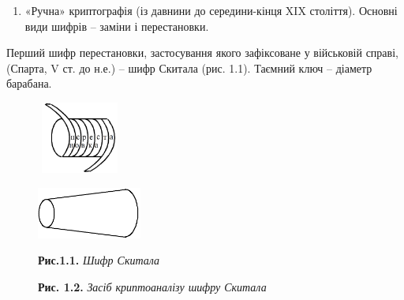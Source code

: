 \documentclass[a4paper]{article}
\newcommand\liststyleWWviiiNumxl{%
\renewcommand\theenumi{\arabic{enumi}}
\renewcommand\theenumii{\arabic{enumii}}
\renewcommand\theenumiii{\arabic{enumiii}}
\renewcommand\theenumiv{\arabic{enumiv}}
\renewcommand\labelenumi{\theenumi.}
\renewcommand\labelenumii{\theenumii.}
\renewcommand\labelenumiii{\theenumiii.}
\renewcommand\labelenumiv{\theenumiv.}
}
\newcounter{}
\begin{document}
\bigskip


\bigskip

\liststyleWWviiiNumxl
\begin{enumerate}
\item «Ручна» криптографія (із давнини до середини-кінця XIX століття). Основні
види шифрів – заміни і перестановки.
\end{enumerate}
 Перший шифр перестановки, застосування якого зафіксоване у військовій справі,
(Спарта, V ст. до н.е.) – шифр Скитала (рис. 1.1). Таємний ключ – діаметр
барабана.


\bigskip



\begin{figure}
\centering
\begin{minipage}{1.7299in}
{\centering 
\includegraphics[width=1.1043in,height=0.9272in]{crypt-img/crypt-img1.png}
\par}
\end{minipage}
\end{figure}
\begin{figure}
\centering
\begin{minipage}{1.7299in}
{\centering 
\includegraphics[width=1.3543in,height=0.6665in]{crypt-img/crypt-img2.png}
\par}
\end{minipage}
\end{figure}

\bigskip


\bigskip


\bigskip


\bigskip



\begin{figure}
\centering
\begin{minipage}{2.052in}
\textbf{Рис.1.1.} \textit{Шифр Ск}\textit{итала}
\end{minipage}
\end{figure}


\begin{figure}
\centering
\begin{minipage}{2.5209in}
{\centering
\textbf{Рис. 1.2. }\textit{Засіб криптоаналізу шифру Скитала}
\par}


\bigskip


\bigskip
\end{minipage}
\end{figure}
\end{document}
